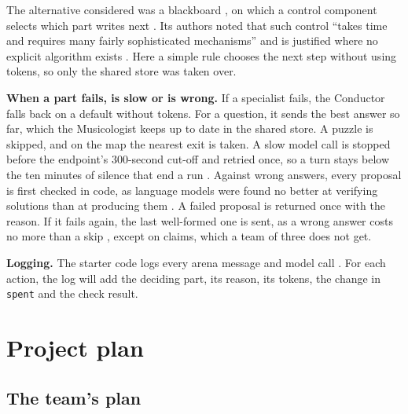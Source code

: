 \documentclass[11pt,a4paper]{article}
\newcommand\code[1]{\texttt{#1}}
\newcommand\lead[1]{\vspace{-\parskip}\textbf{#1}}
\begin{document}
The alternative considered was a blackboard \parencite{erman1980hearsay}, on which a control component selects which part writes next \parencite{course-s2}. Its authors noted that such control \enquote{takes time and requires many fairly sophisticated mechanisms} and is justified where no explicit algorithm exists \parencite[246]{erman1980hearsay}. Here a simple rule chooses the next step without using tokens, so only the shared store was taken over.

\lead{When a part fails, is slow or is wrong.} If a specialist fails, the Conductor falls back on a default without tokens. For a question, it sends the best answer so far, which the Musicologist keeps up to date in the shared store. A puzzle is skipped, and on the map the nearest exit is taken.
 A slow model call is stopped before the endpoint's 300-second cut-off \parencite{course-s4} and retried once, so a turn stays below the ten minutes of silence that end a run \parencite{course-api}. Against wrong answers, every proposal is first checked in code, as language models were found no better at verifying solutions than at producing them \parencite{kambhampati2024position}. A failed proposal is returned once with the reason. If it fails again, the last well-formed one is sent, as a wrong answer costs no more than a skip \parencite{course-api}, except on claims, which a team of three does not get.

\lead{Logging.} The starter code logs every arena message and model call \parencite{course-s4}. For each action, the log will add the deciding part, its reason, its tokens, the change in \code{spent} and the check result.

\section{Project plan}

\subsection{The team's plan}
\end{document}
